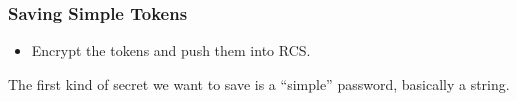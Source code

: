 \begin{frame}
	\frametitle{Saving Simple Tokens}
	\begin{itemize}
		\item Encrypt the tokens and push them into RCS.
	\end{itemize}
    \note[item]The first kind of secret we want to save is a ``simple'' password, basically a string.
\end{frame}
